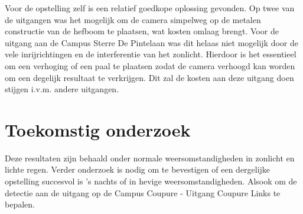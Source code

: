 \documentclass[a0,portrait]{a0poster}
\begin{document}
\begin{multicols}{2}
Voor de opstelling zelf is een relatief goedkope oplossing gevonden. Op twee van de uitgangen was het mogelijk om de camera simpelweg op de metalen constructie van de hefboom te plaatsen, wat kosten omlaag brengt. Voor de uitgang aan de Campus Sterre De Pintelaan was dit helaas niet mogelijk door de vele inrijrichtingen en de interferentie van het zonlicht. Hierdoor is het essentieel om een verhoging of een paal te plaatsen zodat de camera verhoogd kan worden om een degelijk resultaat te verkrijgen. Dit zal de kosten aan deze uitgang doen stijgen i.v.m. andere uitgangen.


\color{HoGentAccent1} 
\section*{Toekomstig onderzoek}
\color{black}
Deze resultaten zijn behaald onder normale weersomstandigheden in zonlicht en lichte regen. Verder onderzoek is nodig om te bevestigen of een dergelijke opstelling succesvol is 's nachts of in hevige weersomstandigheden. Alsook om de detectie aan de uitgang op de Campus Coupure - Uitgang Coupure Links te bepalen.


\end{multicols}
\end{document}
